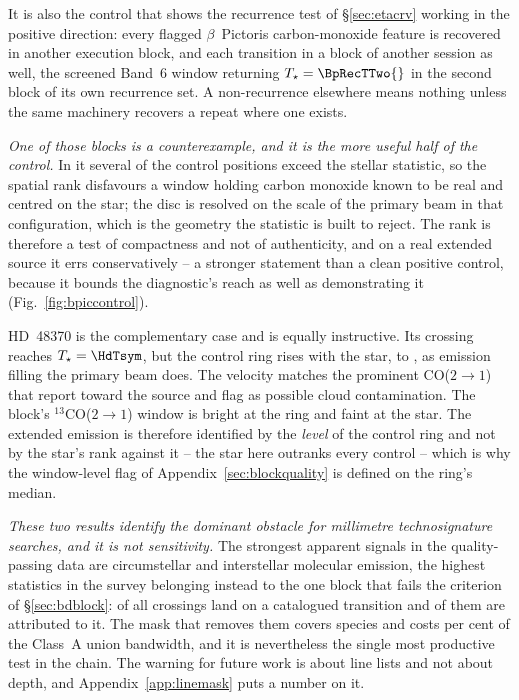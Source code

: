 It is also the control that shows the recurrence test of
\S\ref{sec:etacrv} working in the positive direction: every flagged
$\beta$~Pictoris carbon-monoxide feature is recovered in another execution
block, and each transition in a block of another session as well, the
screened Band~6 window returning
$T_\star=\BpRecTTwo{}$ in the second block of its own recurrence set. A
non-recurrence elsewhere means nothing unless the same machinery recovers a
repeat where one exists.

\emph{One of those blocks is a counterexample, and it is the more useful half
of the control.} In it several of the \NCtrl{} control positions exceed the
stellar statistic, so the spatial rank disfavours a window holding carbon
monoxide known to be real and centred on the star; the disc is resolved on
the scale of the primary beam in that configuration, which is the geometry
the statistic is built to reject. The rank is therefore a test of
compactness and not of authenticity, and on a real extended source it errs
conservatively -- a stronger statement than a clean positive control, because
it bounds the diagnostic's reach as well as demonstrating it
(Fig.~\ref{fig:bpiccontrol}).



HD~48370 is the complementary case and is equally instructive. Its crossing
reaches $T_\star=\HdTsym$, but the control ring rises with the star, to
\HdRingMax, as emission filling the primary beam does. The velocity matches
the prominent CO($2{\to}1$) that \citet{Cataldi2023} report toward the
source and flag as possible cloud contamination. The block's
$^{13}$CO($2{\to}1$) window is bright at the ring and faint at the star.
The extended emission is therefore identified by the \emph{level} of the
control ring and not by the star's rank against it -- the star here outranks
every control -- which is why the window-level flag of
Appendix~\ref{sec:blockquality} is defined on the ring's median.

\emph{These two results identify the dominant obstacle for
millimetre technosignature searches, and it is not sensitivity.} The
strongest apparent signals in the quality-passing data are circumstellar and
interstellar molecular emission, the \DqBlockNCross{} highest statistics in the
survey belonging instead to the one block that fails the criterion of
\S\ref{sec:bdblock}: \MkNCoinc{} of all \NCross{} crossings land
on a catalogued transition and \NAttributed{} of them are attributed to it.
The mask that
removes them covers \FrNSpec{} species and costs \MkMaskAPct{} per cent of
the Class~A union bandwidth, and it is nevertheless the single most
productive test in the chain. The warning for
future work is about line lists and not about depth, and
Appendix~\ref{app:linemask} puts a number on it.

